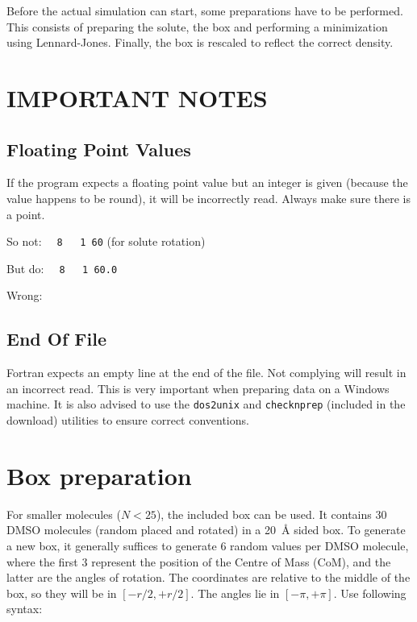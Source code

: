 Before the actual simulation can start, some preparations have to be performed.
This consists of preparing the solute, the box and performing a minimization 
using Lennard-Jones. Finally, the box is rescaled to reflect the correct 
density.

\section{IMPORTANT NOTES}
\subsection{Floating Point Values}
If the program expects a floating point value but an integer is given (because 
the value happens to be round), it will be incorrectly read. Always make sure 
there is a point.

So not: \verb|  8   1 60| (for solute rotation)

But do: \verb|  8   1 60.0|

Wrong: \textvisiblespace{} 
\textvisiblespace\textvisiblespace{} 

\texttt{}

\vispace

\subsection{End Of File}
Fortran expects an empty line at the end of the file. Not complying will result 
in an incorrect read. This is very important when preparing data on a Windows 
machine. It is also advised to use the \verb|dos2unix| and \verb|checknprep| 
(included in the download) utilities to ensure correct conventions.

\section{Box preparation}
For smaller molecules ($N < 25$), the included box can be used. It contains 30 
DMSO molecules (random placed and rotated) in a \SI{20}{\angstrom} sided box.
To generate a new box, it generally suffices to generate 6 random values per 
DMSO molecule, where the first 3 represent the position of the Centre of Mass 
(CoM), and the latter are the angles of rotation. The coordinates are relative 
to the middle of the box, so they will be in $[-r/2, +r/2]$. The angles lie in 
$[-\pi, +\pi]$. Use following syntax:

